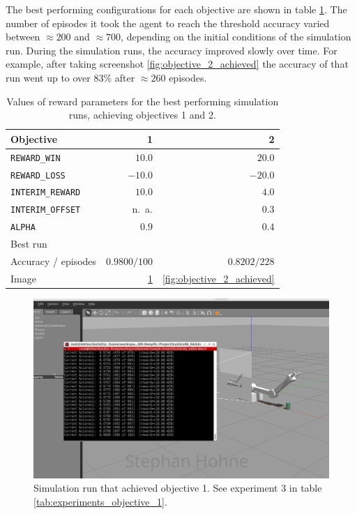 \documentclass[11pt, onecolumn, oneside, reqno]{amsart}
\begin{document}
The best performing configurations for each objective are shown in table \ref{tab:reward_params_objectives}. The number of episodes it took the agent to reach the threshold accuracy varied between $\approx 200$ and $\approx 700$, depending on the initial conditions of the simulation run. During the simulation runs, the accuracy improved slowly over time. For example, after taking screenshot \ref{fig:objective_2_achieved} the accuracy of that run went up to over $83\%$ after $\approx 260$ episodes.

\begin{table}[thpb]
	\centering
	\renewcommand{\arraystretch}{1.3}
	\begin{tabular}{|l|r|r|}
	\hline
	Objective & 1 & 2  \\
	\hline
	\texttt{REWARD\_WIN}   & $10.0$ & $20.0$  \\
	\texttt{REWARD\_LOSS}   & $-10.0$ & $-20.0$  \\
	\hline
	\texttt{INTERIM\_REWARD}   & $10.0$ & $4.0$  \\
	\texttt{INTERIM\_OFFSET}   & n.\ a. & $0.3$  \\
	\hline
	\texttt{ALPHA}   & $0.9$ & $0.4$  \\
	\hline
	\multicolumn{3}{|l|}{Best run} \\ 
	\hline
	Accuracy / episodes & $0.9800 / 100$  & $0.8202 / 228$ \\
	\hline
	Image &  \ref{fig:objective_1_achieved} &  \ref{fig:objective_2_achieved} \\
	\hline
	\end{tabular}
	\caption{Values of reward parameters for the best performing simulation runs, achieving objectives 1 and 2.}
	\label{tab:reward_params_objectives}
\end{table}

\begin{figure}[htpb]
      \centering
      \includegraphics[width=\linewidth]{images/100_signed.PNG}
      \caption{Simulation run that achieved objective 1. See experiment 3 in table \ref{tab:experiments_objective_1}.}
      \label{fig:objective_1_achieved}
\end{figure}
\end{document}
